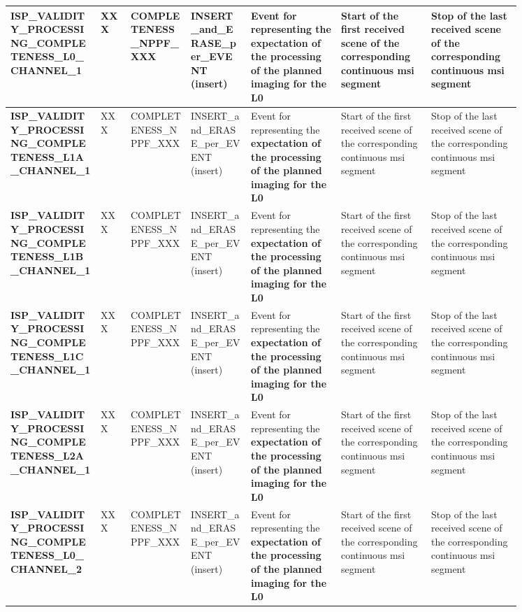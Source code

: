\begin{landscape}
\begin{longtable}{|M{0.15\linewidth}|M{0.05\linewidth}|M{0.10\linewidth}|M{0.10\linewidth}|M{0.15\linewidth}|M{0.15\linewidth}|M{0.15\linewidth}|}
\textbf{ISP\_VALIDITY\_PROCESSING\_COMPLETENESS\_L0\_CHANNEL\_1} & XXX & \- COMPLETENESS\_NPPF\_XXX & INSERT\_and\_ERASE\_per\_EVENT (insert) & Event for representing the \textbf{expectation of the processing of the planned imaging for the L0} & Start of the first received scene of the corresponding continuous \acrshort{msi} segment & Stop of the last received scene of the corresponding continuous \acrshort{msi} segment \\ \hline
\textbf{ISP\_VALIDITY\_PROCESSING\_COMPLETENESS\_L1A\_CHANNEL\_1} & XXX & \- COMPLETENESS\_NPPF\_XXX & INSERT\_and\_ERASE\_per\_EVENT (insert) & Event for representing the \textbf{expectation of the processing of the planned imaging for the L0} & Start of the first received scene of the corresponding continuous \acrshort{msi} segment & Stop of the last received scene of the corresponding continuous \acrshort{msi} segment \\ \hline
\textbf{ISP\_VALIDITY\_PROCESSING\_COMPLETENESS\_L1B\_CHANNEL\_1} & XXX & \- COMPLETENESS\_NPPF\_XXX & INSERT\_and\_ERASE\_per\_EVENT (insert) & Event for representing the \textbf{expectation of the processing of the planned imaging for the L0} & Start of the first received scene of the corresponding continuous \acrshort{msi} segment & Stop of the last received scene of the corresponding continuous \acrshort{msi} segment \\ \hline
\textbf{ISP\_VALIDITY\_PROCESSING\_COMPLETENESS\_L1C\_CHANNEL\_1} & XXX & \- COMPLETENESS\_NPPF\_XXX & INSERT\_and\_ERASE\_per\_EVENT (insert) & Event for representing the \textbf{expectation of the processing of the planned imaging for the L0} & Start of the first received scene of the corresponding continuous \acrshort{msi} segment & Stop of the last received scene of the corresponding continuous \acrshort{msi} segment \\ \hline
\textbf{ISP\_VALIDITY\_PROCESSING\_COMPLETENESS\_L2A\_CHANNEL\_1} & XXX & \- COMPLETENESS\_NPPF\_XXX & INSERT\_and\_ERASE\_per\_EVENT (insert) & Event for representing the \textbf{expectation of the processing of the planned imaging for the L0} & Start of the first received scene of the corresponding continuous \acrshort{msi} segment & Stop of the last received scene of the corresponding continuous \acrshort{msi} segment \\ \hline
\textbf{ISP\_VALIDITY\_PROCESSING\_COMPLETENESS\_L0\_CHANNEL\_2} & XXX & \- COMPLETENESS\_NPPF\_XXX & INSERT\_and\_ERASE\_per\_EVENT (insert) & Event for representing the \textbf{expectation of the processing of the planned imaging for the L0} & Start of the first received scene of the corresponding continuous \acrshort{msi} segment & Stop of the last received scene of the corresponding continuous \acrshort{msi} segment \\ \hline

\end{longtable}
\end{landscape}
